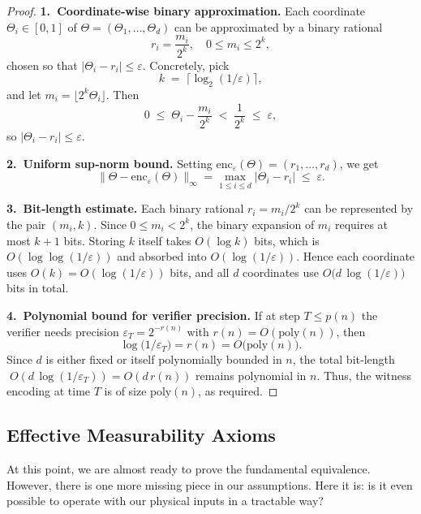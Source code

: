 \documentclass[12pt]{article}
\theoremstyle{definition}
\theoremstyle{plain}
\begin{document}
\begin{proof}
\textbf{1.\ Coordinate‑wise binary approximation.}  
Each coordinate \(\Theta_i\in[0,1]\) of \(\Theta=(\Theta_1,\dots,\Theta_d)\)
can be approximated by a binary rational
\[
  r_i = \frac{m_i}{2^k}, 
  \quad
  0 \le m_i \le 2^k,
\]
chosen so that \(\lvert \Theta_i - r_i\rvert \le \varepsilon\).  Concretely, pick
\[
  k \;=\;\bigl\lceil\log_2(1/\varepsilon)\bigr\rceil,
\]
and let \(m_i=\lfloor 2^k\Theta_i\rfloor\).  Then
\[
  0 \;\le\;\Theta_i - \frac{m_i}{2^k}
  \;<\;\frac{1}{2^k}
  \;\le\;\varepsilon,
\]
so \(\lvert\Theta_i - r_i\rvert\le\varepsilon\).

\medskip\noindent
\textbf{2.\ Uniform sup‑norm bound.}  
Setting
\(\mathrm{enc}_{\varepsilon}(\Theta)=(r_1,\dots,r_d)\), we get
\[
  \bigl\|\Theta - \mathrm{enc}_{\varepsilon}(\Theta)\bigr\|_\infty
  = \max_{1\le i\le d}\! \lvert\Theta_i - r_i\rvert
  \;\le\;\varepsilon.
\]

\medskip\noindent
\textbf{3.\ Bit‑length estimate.}  
Each binary rational \(r_i=m_i/2^k\) can be represented by the pair
\((m_i,k)\).  Since \(0\le m_i<2^k\), the binary expansion of \(m_i\)
requires at most \(k+1\) bits.  Storing \(k\) itself takes \(O(\log k)\)
bits, which is \(O(\log\log(1/\varepsilon))\) and absorbed into
\(O(\log(1/\varepsilon))\).  Hence each coordinate uses
\(O(k)=O(\log(1/\varepsilon))\) bits, and all \(d\) coordinates use
\(O\bigl(d\,\log(1/\varepsilon)\bigr)\) bits in total.

\medskip\noindent
\textbf{4.\ Polynomial bound for verifier precision.}  
If at step \(T\le p(n)\) the verifier needs precision
\(\varepsilon_T=2^{-r(n)}\) with \(r(n)=O(\mathrm{poly}(n))\), then
\[
  \log\bigl(1/\varepsilon_T\bigr)
  = r(n)
  = O\bigl(\mathrm{poly}(n)\bigr).
\]
Since \(d\) is either fixed or itself polynomially bounded in \(n\),
the total bit‑length
\(\;O(d\,\log(1/\varepsilon_T))=O(d\,r(n))\)
remains polynomial in \(n\).  Thus, the witness encoding at time \(T\)
is of size \(\mathrm{poly}(n)\), as required. 
\end{proof}


\subsection{Effective Measurability Axioms}
\label{subsec:effective-measurability-axioms}
At this point, we are almost ready to prove the fundamental equivalence. However, there is one more missing piece in our assumptions. Here it is: is it even possible to operate with our physical inputs in a tractable way? 
\end{document}
